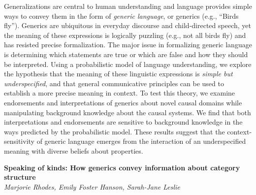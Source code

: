 \documentclass[10pt,letterpaper]{article}
\begin{document}
Generalizations are central to human understanding and language provides simple ways to convey them in the form of \emph{generic language}, or generics (e.g., ``Birds fly''). 
Generics are ubiquitous in everyday discourse and child-directed speech, yet the meaning of these expressions is logically puzzling (e.g., not all birds fly) and has resisted precise formalization. 
The major issue in formalizing generic language is determining which statements are true or which are false and how they should be interpreted.
Using a probabilistic model of language understanding, we explore the hypothesis that the meaning of these linguistic expressions is \emph{simple but underspecified}, and that general communicative principles can be used to establish a more precise meaning in context. 
To test this theory, we examine endorsements and interpretations of generics about novel causal domains while manipulating background knowledge about the causal systems. 
We find that both interpretations and endorsements are sensitive to background knowledge in the ways predicted by the probabilistic model. 
These results suggest that the context-sensitivity of generic language emerges from the interaction of an underspecified meaning with diverse beliefs about properties.


\noindent\textbf{Speaking of kinds: How generics convey information about category structure} \\
\noindent\emph{Marjorie Rhodes, Emily Foster Hanson, Sarah-Jane Leslie}
\end{document}
